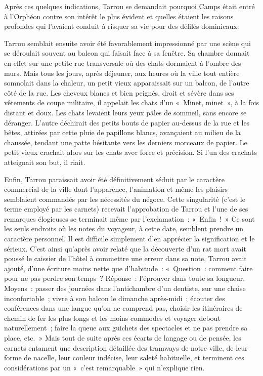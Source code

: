 \documentclass[french,twoside]{book} %
\begin{document}
Après ces quelques indications, Tarrou se demandait pourquoi Camps était entré à l’Orphéon contre son intérêt le plus évident et quelles étaient les raisons profondes qui l’avaient conduit à risquer sa vie pour des défilés dominicaux.\par
Tarrou semblait ensuite avoir été favorablement impressionné par une scène qui se déroulait souvent au balcon qui faisait face à sa fenêtre. Sa chambre donnait en effet sur une petite rue transversale où des chats dormaient à l’ombre des murs. Mais tous les jours, après déjeuner, aux heures où la ville tout entière somnolait dans la chaleur, un petit vieux apparaissait sur un balcon, de l’autre côté de la rue. Les cheveux blancs et bien peignés, droit et sévère dans ses vêtements de coupe militaire, il appelait les chats d’un « Minet, minet », à la fois distant et doux. Les chats levaient leurs yeux pâles de sommeil, sans encore se déranger. L’autre déchirait des petits bouts de papier au-dessus de la rue et les bêtes, attirées par cette pluie de papillons blancs, avançaient au milieu de la chaussée, tendant une patte hésitante vers les derniers morceaux de papier. Le petit vieux crachait alors sur les chats avec force et précision. Si l’un des crachats atteignait son but, il riait.\par
Enfin, Tarrou paraissait avoir été définitivement séduit par le caractère commercial de la ville dont l’apparence, l’animation et même les plaisirs semblaient commandés par les nécessités du négoce. Cette singularité (c’est le terme employé par les carnets) recevait l’approbation de Tarrou et l’une de ses remarques élogieuses se terminait même par l’exclamation : « Enfin ! » Ce sont les seuls endroits où les notes du voyageur, à cette date, semblent prendre un caractère personnel. Il est difficile simplement d’en apprécier la signification et le sérieux. C’est ainsi qu’après avoir relaté que la découverte d’un rat mort avait poussé le caissier de l’hôtel à commettre une erreur dans sa note, Tarrou avait ajouté, d’une écriture moins nette que d’habitude : « Question : comment faire pour ne pas perdre son temps ? Réponse : l’éprouver dans toute sa longueur. Moyens : passer des journées dans l’antichambre d’un dentiste, sur une chaise inconfortable ; vivre à son balcon le dimanche après-midi ; écouter des conférences dans une langue qu’on ne comprend pas, choisir les itinéraires de chemin de fer les plus longs et les moins commodes et voyager debout naturellement ; faire la queue aux guichets des spectacles et ne pas prendre sa place, etc. » Mais tout de suite après ces écarts de langage ou de pensée, les carnets entament une description détaillée des tramways de notre ville, de leur forme de nacelle, leur couleur indécise, leur saleté habituelle, et terminent ces considérations par un « c’est remarquable » qui n’explique rien.\par
\end{document}
